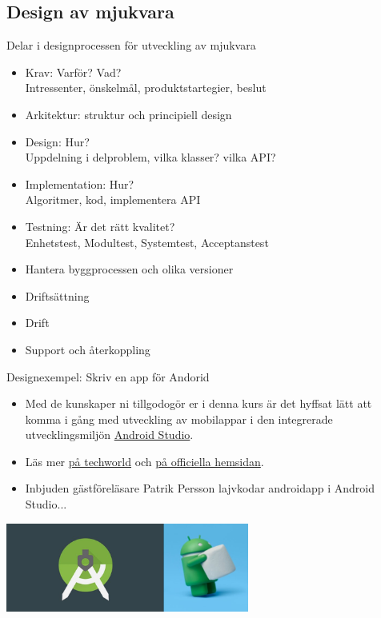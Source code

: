 \documentclass{lecturenotes}
\begin{document}
\subsection{Design av mjukvara}
\begin{Slide}{Delar i designprocessen för utveckling av mjukvara}
\begin{itemize}
\item Krav: Varför? Vad? \\ Intressenter, önskelmål, produktstartegier, beslut
\item Arkitektur: struktur och principiell design
\item Design: Hur? \\ Uppdelning i delproblem, vilka klasser? vilka API?
\item Implementation: Hur? \\ 
Algoritmer, kod, implementera API
\item Testning: Är det rätt kvalitet? \\ Enhetstest, Modultest, Systemtest, Acceptanstest
\item Hantera byggprocessen och olika versioner
\item Driftsättning  
\item Drift 
\item Support och återkoppling
\end{itemize}
\end{Slide}

\begin{Slide}{Designexempel: Skriv en app för Andorid}
\begin{itemize}
\item Med de kunskaper ni tillgodogör er i denna kurs är det hyffsat lätt att komma i gång med utveckling av mobilappar i den integrerade utvecklingsmiljön \href{https://en.wikipedia.org/wiki/Android_Studio}{Android Studio}.
\item Läs mer \href{http://techworld.idg.se/2.2524/1.602344/premiar-for-android-studio}{på techworld} och \href{http://developer.android.com/develop/index.html}{på officiella hemsidan}.
\item Inbjuden gästföreläsare Patrik Persson lajvkodar androidapp i Android Studio...
\end{itemize}
\begin{center}
\includegraphics[width=0.6\textwidth]{img/android-studio}
\end{center}
\end{Slide}
\end{document}
